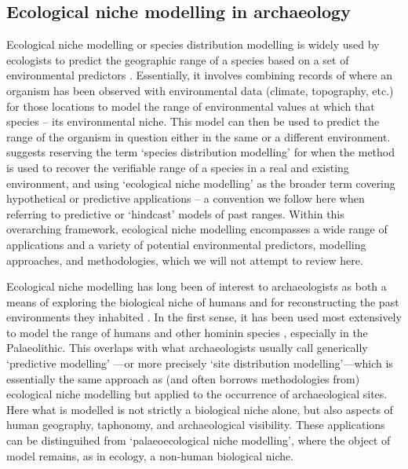 \documentclass[
  authoryear,
  preprint]{elsarticle}
\begin{document}
\subsection{Ecological niche modelling in
archaeology}\label{ecological-niche-modelling-in-archaeology}

Ecological niche modelling or species distribution modelling is widely
used by ecologists to predict the geographic range of a species based on
a set of environmental predictors \citep{FranklinMiller2009}.
Essentially, it involves combining records of where an organism has been
observed with environmental data (climate, topography, etc.) for those
locations to model the range of environmental values at which that
species -- its environmental niche. This model can then be used to
predict the range of the organism in question either in the same or a
different environment. \citet{TownsendPetersonSoberon2012} suggests
reserving the term `species distribution modelling' for when the method
is used to recover the verifiable range of a species in a real and
existing environment, and using `ecological niche modelling' as the
broader term covering hypothetical or predictive applications -- a
convention we follow here when referring to predictive or `hindcast'
models of past ranges. Within this overarching framework, ecological
niche modelling encompasses a wide range of applications and a variety
of potential environmental predictors, modelling approaches, and
methodologies, which we will not attempt to review here.

Ecological niche modelling has long been of interest to archaeologists
as both a means of exploring the biological niche of humans and for
reconstructing the past environments they inhabited
\citep{DavidPollyEronen2011, FranklinEtAl2015}. In the first sense, it
has been used most extensively to model the range of humans and other
hominin species
\citep[e.g.][]{BenitoEtAl2017, YousefiEtAl2020, BanksEtAl2021, YaworskyEtAl2024a, YaworskyEtAl2024b, GuranEtAl2024},
especially in the Palaeolithic. This overlaps with what archaeologists
usually call generically `predictive modelling'
\citep{VerhagenWhitley2020}---or more precisely `site distribution
modelling'---which is essentially the same approach as (and often
borrows methodologies from) ecological niche modelling but applied to
the occurrence of archaeological sites. Here what is modelled is not
strictly a biological niche alone, but also aspects of human geography,
taphonomy, and archaeological visibility. These applications can be
distinguihed from `palaeoecological niche modelling', where the object
of model remains, as in ecology, a non-human biological niche.
\end{document}
